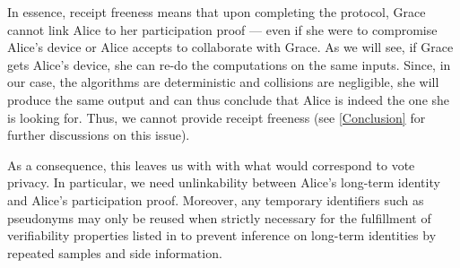 In essence, receipt freeness means that upon completing the protocol, Grace cannot link Alice to her participation proof --- even if she were to compromise Alice's device or Alice accepts to collaborate with Grace.
As we will see, if Grace gets Alice's device, she can re-do the computations on the same inputs.
Since, in our case, the algorithms are deterministic and collisions are negligible, she will produce the same output and can thus conclude that Alice is indeed the one she is looking for.
Thus, we cannot provide receipt freeness (see \cref{Conclusion} for further discussions on this issue).

As a consequence, this leaves us with with what would correspond to vote privacy.
In particular, we need unlinkability between Alice's long-term identity and Alice's participation proof.
Moreover, any temporary identifiers such as pseudonyms may only be reused when strictly necessary for the fulfillment of verifiability properties listed in \label{verifiability-properties} to prevent inference on long-term identities by repeated samples and side information.

